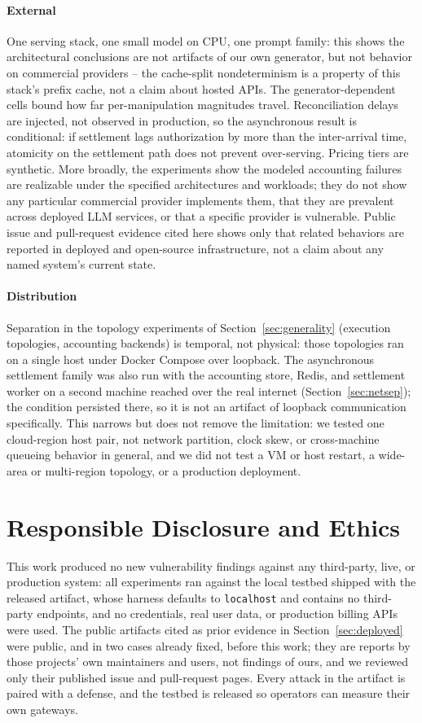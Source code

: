 \documentclass[final,5p,times,twocolumn,number]{elsarticle}
\begin{document}
\paragraph{External}
One serving stack, one small model on CPU, one prompt family: this shows the
architectural conclusions are not artifacts of our own generator, but not behavior on
commercial providers -- the cache-split nondeterminism is a property of this stack's
prefix cache, not a claim about hosted APIs. The generator-dependent cells bound how far
per-manipulation magnitudes travel. Reconciliation delays are injected, not observed in
production, so the asynchronous result is conditional: if settlement lags authorization by
more than the inter-arrival time, atomicity on the settlement path does not prevent
over-serving. Pricing tiers are synthetic. More broadly, the experiments show the modeled
accounting failures are realizable under the specified architectures and workloads; they
do not show any particular commercial provider implements them, that they are prevalent
across deployed LLM services, or that a specific provider is vulnerable. Public issue and
pull-request evidence cited here shows only that related behaviors are reported in
deployed and open-source infrastructure, not a claim about any named system's current
state.

\paragraph{Distribution}
Separation in the topology experiments of Section~\ref{sec:generality} (execution
topologies, accounting backends) is temporal, not physical: those topologies ran on a
single host under Docker Compose over loopback. The asynchronous settlement family was
also run with the accounting store, Redis, and settlement worker on a second machine
reached over the real internet (Section~\ref{sec:netsep}); the condition persisted there,
so it is not an artifact of loopback communication specifically. This narrows but does
not remove the limitation: we tested one cloud-region
host pair, not network partition, clock skew, or cross-machine queueing behavior in
general, and we did not test a VM or host restart, a wide-area or multi-region topology,
or a production deployment.

\section{Responsible Disclosure and Ethics}
This work produced no new vulnerability findings against any third-party, live, or
production system: all experiments ran against the local testbed shipped with the
released artifact, whose harness defaults to \texttt{localhost} and contains no
third-party endpoints, and no credentials, real user data, or production billing APIs
were used. The public artifacts cited as prior evidence in Section~\ref{sec:deployed}
were public, and in two cases already fixed, before this work; they are reports by those
projects' own maintainers and users, not findings of ours, and we reviewed only their
published issue and pull-request pages. Every attack in the artifact is paired with a
defense, and the testbed is released so operators can measure their own gateways.
\end{document}
